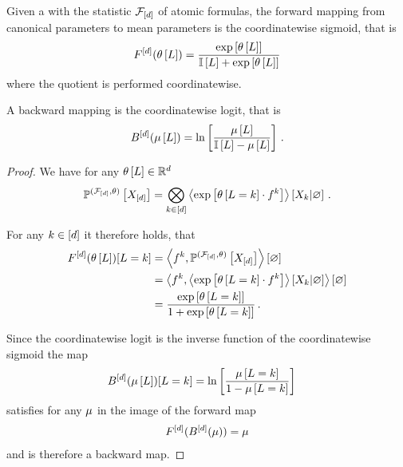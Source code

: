 \begin{theorem}
    Given a \MarkovLogicNetwork{} with the statistic $\mathcal{F}_{[d]}$ of atomic formulas, the forward mapping from canonical parameters to mean parameters is the coordinatewise sigmoid, that is
    \[ F^{[d]}(\theta\left[L\right]) = \frac{\mathrm{exp}\left[\theta\left[L\right]\right]}{\mathbb{I}\left[L\right]+\mathrm{exp}\left[\theta\left[L\right]\right]}   \]
    where the quotient is performed coordinatewise.

    A backward mapping is the coordinatewise logit, that is
    \[ B^{[d]}(\mu\left[L\right])
    = \ln \left[ \frac{
        \mu\left[L\right]
    }{
        \mathbb{I}\left[L\right]-\mu\left[L\right]
    } \right]  \, . \]
\end{theorem}
\begin{proof}
    We have for any $\theta\left[L\right]\in\mathbb{R}^{d}$
    \[ \mathbb{P}^{(\mathcal{F}_{[d]},\theta)}\left[X_{[d]}\right]
    = \bigotimes_{k\in[d]} \left\langle \mathrm{exp}\left[\theta\left[L=k\right]\cdot f^{k}\right]\right\rangle \left[ X_{k} | \varnothing \right]  \, . \]


    For any $k\in[d]$ it therefore holds, that
    \begin{align*}
        F^{[d]}(\theta\left[L\right])[L=k]
        &=\left\langle f^{k},  \mathbb{P}^{(\mathcal{F}_{[d]},\theta)}\left[X_{[d]}\right]\right\rangle \left[ \varnothing \right] \\
        &=\left\langle f^{k},  \left\langle \mathrm{exp}\left[\theta\left[L=k\right]\cdot f^{k}\right]\right\rangle \left[ X_{k} | \varnothing \right]\right\rangle \left[ \varnothing \right] \\
        & = \frac{\mathrm{exp}\left[\theta\left[L=k\right]\right]}{1+\mathrm{exp}\left[\theta\left[L=k\right]\right]} \, .
    \end{align*}

    Since the coordinatewise logit is the inverse function of the coordinatewise sigmoid the map
    \begin{align*}
        B^{[d]}(\mu\left[L\right])[L=k]
        & = \ln \left[ \frac{\mu\left[L=k\right]}{1- \mu\left[L=k\right]} \right]
    \end{align*}
    satisfies for any $\mu$ in the image of the forward map
    \begin{align*}
        F^{[d]}(B^{[d]}(\mu)) = \mu
    \end{align*}
    and is therefore a backward map.
\end{proof}


